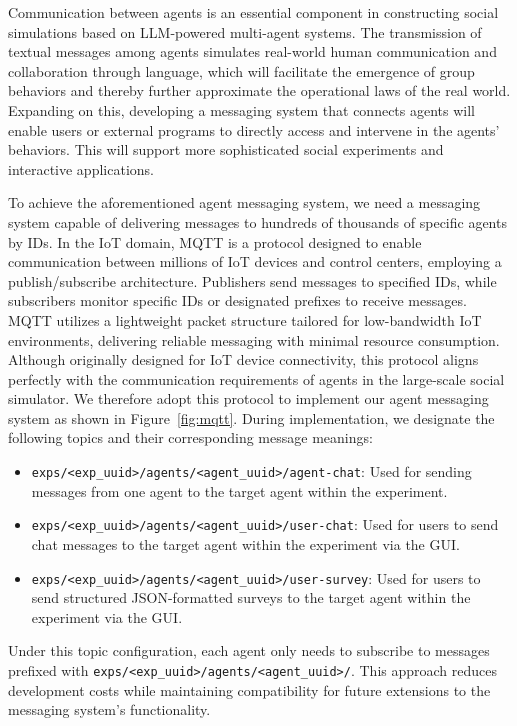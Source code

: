 Communication between agents is an essential component in constructing social simulations based on LLM-powered multi-agent systems.
The transmission of textual messages among agents simulates real-world human communication and collaboration through language, which will facilitate the emergence of group behaviors and thereby further approximate the operational laws of the real world.
Expanding on this, developing a messaging system that connects agents will enable users or external programs to directly access and intervene in the agents' behaviors.
This will support more sophisticated social experiments and interactive applications.

To achieve the aforementioned agent messaging system, we need a messaging system capable of delivering messages to hundreds of thousands of specific agents by IDs.
In the IoT domain, MQTT is a protocol designed to enable communication between millions of IoT devices and control centers, employing a publish/subscribe architecture.
Publishers send messages to specified IDs, while subscribers monitor specific IDs or designated prefixes to receive messages.
MQTT utilizes a lightweight packet structure tailored for low-bandwidth IoT environments, delivering reliable messaging with minimal resource consumption.
Although originally designed for IoT device connectivity, this protocol aligns perfectly with the communication requirements of agents in the large-scale social simulator.
We therefore adopt this protocol to implement our agent messaging system as shown in Figure~\ref{fig:mqtt}.
During implementation, we designate the following topics and their corresponding message meanings:
\begin{itemize}
    \item \texttt{exps/<exp\_uuid>/agents/<agent\_uuid>/agent-chat}: Used for sending messages from one agent to the target agent within the experiment.
    \item \texttt{exps/<exp\_uuid>/agents/<agent\_uuid>/user-chat}: Used for users to send chat messages to the target agent within the experiment via the GUI.
    \item \texttt{exps/<exp\_uuid>/agents/<agent\_uuid>/user-survey}: Used for users to send structured JSON-formatted surveys to the target agent within the experiment via the GUI.
\end{itemize}
Under this topic configuration, each agent only needs to subscribe to messages prefixed with \texttt{exps/<exp\_uuid>/agents/<agent\_uuid>/}.
This approach reduces development costs while maintaining compatibility for future extensions to the messaging system's functionality.

